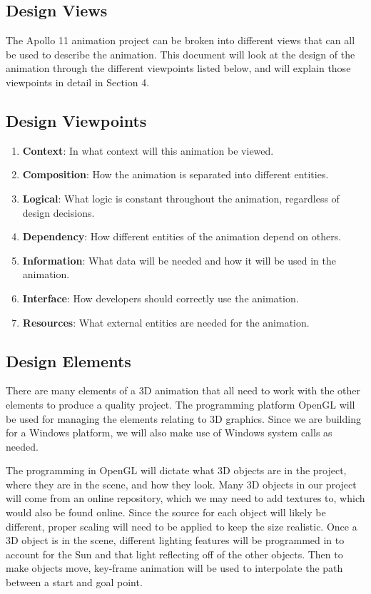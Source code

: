 \documentclass[onecolumn, draftclsnofoot,10pt, compsoc]{IEEEtran}
\begin{document}
\subsection{Design Views}
    The Apollo 11 animation project can be broken into different views that can all be used to describe the animation. This document will look at the design of the animation through the different viewpoints listed below, and will explain those viewpoints in detail in Section 4. 
    
    \subsection{Design Viewpoints}
    \begin{enumerate}
        \item \textbf{Context}: In what context will this animation be viewed.
        \item \textbf{Composition}: How the animation is separated into different entities.
        \item \textbf{Logical}: What logic is constant throughout the animation, regardless of design decisions.
        \item \textbf{Dependency}: How different entities of the animation depend on others.
        \item \textbf{Information}: What data will be needed and how it will be used in the animation. 
        \item \textbf{Interface}: How developers should correctly use the animation.
        \item \textbf{Resources}: What external entities are needed for the animation. 
    \end{enumerate}
    
    \subsection{Design Elements}
    There are many elements of a 3D animation that all need to work with the other elements to produce a quality project. The programming platform OpenGL will be used for managing the elements relating to 3D graphics. Since we are building for a Windows platform, we will also make use of Windows system calls as needed.
    
    The programming in OpenGL will dictate what 3D objects are in the project, where they are in the scene, and how they look. Many 3D objects in our project will come from an online repository, which we may need to add textures to, which would also be found online. Since the source for each object will likely be different, proper scaling will need to be applied to keep the size realistic. Once a 3D object is in the scene, different lighting features will be programmed in to account for the Sun and that light reflecting off of the other objects. Then to make objects move, key-frame animation will be used to interpolate the path between a start and goal point. 
\end{document}
